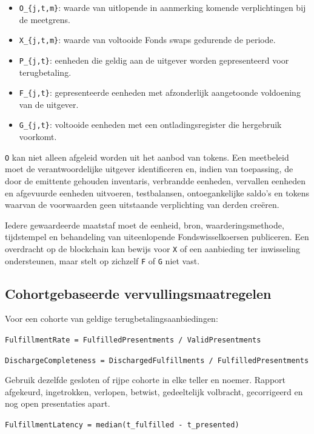 \documentclass[11pt]{article}
\begin{document}
\begin{itemize}[leftmargin=*]
\item \texttt{O\_\{j,t,m\}}: waarde van uitlopende in aanmerking komende verplichtingen bij de meetgrens.
\item \texttt{X\_\{j,t,m\}}: waarde van voltooide Fonds swaps gedurende de periode.
\item \texttt{P\_\{j,t\}}: eenheden die geldig aan de uitgever worden gepresenteerd voor terugbetaling.
\item \texttt{F\_\{j,t\}}: gepresenteerde eenheden met afzonderlijk aangetoonde voldoening van de uitgever.
\item \texttt{G\_\{j,t\}}: voltooide eenheden met een ontladingsregister die hergebruik voorkomt.
\end{itemize}
\texttt{O} kan niet alleen afgeleid worden uit het aanbod van tokens. Een meetbeleid moet de verantwoordelijke uitgever identificeren en, indien van toepassing, de door de emittente gehouden inventaris, verbrandde eenheden, vervallen eenheden en afgevuurde eenheden uitvoeren, testbalansen, ontoegankelijke saldo's en tokens waarvan de voorwaarden geen uitstaande verplichting van derden creëren.

Iedere gewaardeerde maatstaf moet de eenheid, bron, waarderingsmethode, tijdstempel en behandeling van uiteenlopende Fondswisselkoersen publiceren. Een overdracht op de blockchain kan bewijs voor \texttt{X} of een aanbieding ter inwisseling ondersteunen, maar stelt op zichzelf \texttt{F} of \texttt{G} niet vast.

\subsection*{Cohortgebaseerde vervullingsmaatregelen}

Voor een cohorte van geldige terugbetalingsaanbiedingen:

\texttt{FulfillmentRate = FulfilledPresentments / ValidPresentments}

\texttt{DischargeCompleteness = DischargedFulfillments / FulfilledPresentments}

Gebruik dezelfde gesloten of rijpe cohorte in elke teller en noemer. Rapport afgekeurd, ingetrokken, verlopen, betwist, gedeeltelijk volbracht, gecorrigeerd en nog open presentaties apart.

\texttt{FulfillmentLatency = median(t\_fulfilled - t\_presented)}
\end{document}
